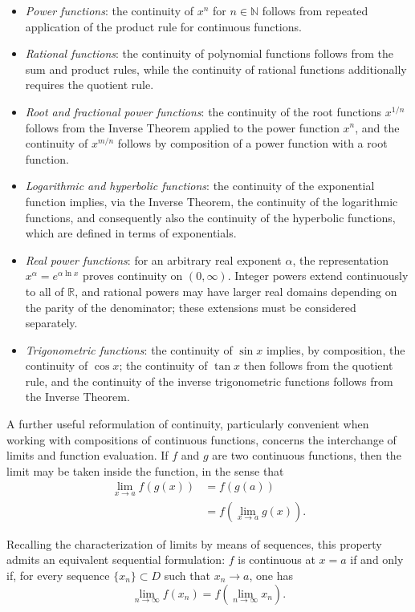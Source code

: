 \begin{itemize}
\item \textit{Power functions}: the continuity of $x^n$ for $n \in \mathbb{N}$ follows from repeated application of the product rule for continuous functions.
\item \textit{Rational functions}: the continuity of polynomial functions follows from the sum and product rules, while the continuity of rational functions additionally requires the quotient rule.
\item \textit{Root and fractional power functions}: the continuity of the root functions $x^{1/n}$ follows from the Inverse Theorem applied to the power function $x^n$, and the continuity of $x^{m/n}$ follows by composition of a power function with a root function.
\item \textit{Logarithmic and hyperbolic functions}: the continuity of the exponential function implies, via the Inverse Theorem, the continuity of the logarithmic functions, and consequently also the continuity of the hyperbolic functions, which are defined in terms of exponentials.
\item \textit{Real power functions}: for an arbitrary real exponent
$\alpha$, the representation $x^\alpha=e^{\alpha\ln x}$ proves continuity
on $(0,\infty)$. Integer powers extend continuously to all of
$\mathbb{R}$, and rational powers may have larger real domains depending
on the parity of the denominator; these extensions must be considered
separately.
\item \textit{Trigonometric functions}: the continuity of $\sin x$ implies, by composition, the continuity of $\cos x$; the continuity of $\tan x$ then follows from the quotient rule, and the continuity of the inverse trigonometric functions follows from the Inverse Theorem.
\end{itemize}

A further useful reformulation of continuity, particularly convenient when working with compositions of continuous functions, concerns the interchange of limits and function evaluation. If $f$ and $g$ are two continuous functions, then the limit may be taken inside the function, in the sense that
\[
\begin{aligned}
\lim_{x \to a} f(g(x)) &= f(g(a)) \\
&= f\left( \lim_{x \to a} g(x) \right).
\end{aligned}
\]

Recalling the characterization of limits by means of sequences, this property admits an equivalent sequential formulation: $f$ is continuous at $x = a$ if and only if, for every sequence $\{x_n\} \subset D$ such that $x_n \to a$, one has
\[
\lim_{n \to \infty} f(x_n) = f\left( \lim_{n \to \infty} x_n \right).
\]


